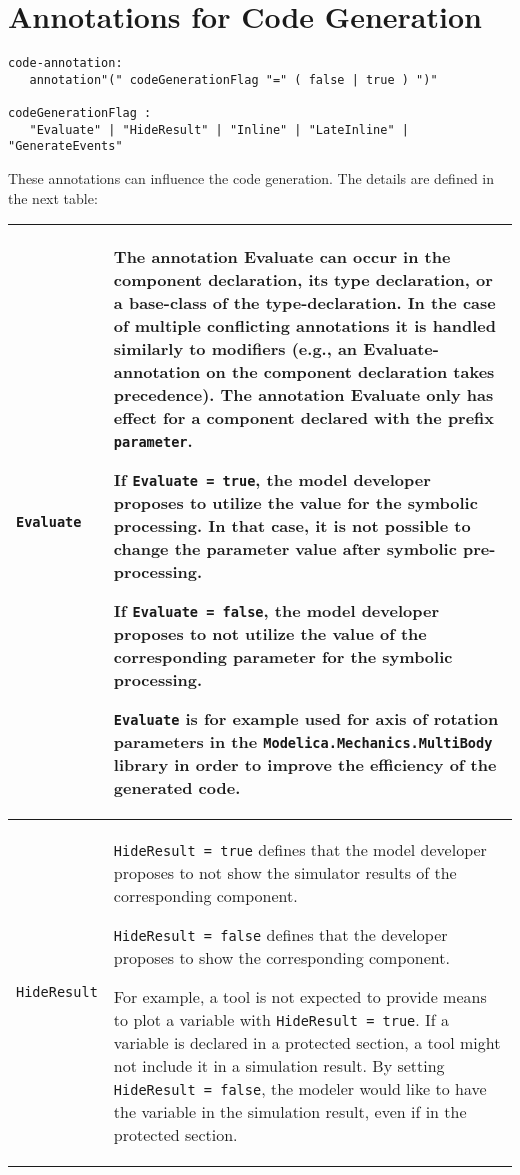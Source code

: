 \section{Annotations for Code Generation}\label{annotations-for-code-generation}
\begin{lstlisting}[language=grammar]
code-annotation:
   annotation"(" codeGenerationFlag "=" ( false | true ) ")"

codeGenerationFlag :
   "Evaluate" | "HideResult" | "Inline" | "LateInline" | "GenerateEvents"
\end{lstlisting}
These annotations can influence the code generation. The details are
defined in the next table:
\begin{longtable}[]{|p{4.2cm}|p{10cm}|}
\hline \endhead
\lstinline!Evaluate!&
The annotation Evaluate can occur in the component declaration, its type
declaration, or a base-class of the type-declaration. In the case of
multiple conflicting annotations it is handled similarly to modifiers
(e.g., an Evaluate-annotation on the component declaration takes
precedence). The annotation Evaluate only has effect for a component
declared with the prefix \lstinline!parameter!.

If \lstinline!Evaluate = true!, the model developer proposes to utilize the value
for the symbolic processing. In that case, it is not possible to change
the parameter value after symbolic pre-processing.

If \lstinline!Evaluate = false!, the model developer proposes to not utilize the
value of the corresponding parameter for the symbolic processing.

\begin{nonnormative}
\lstinline!Evaluate! is for example used for axis of rotation parameters in
the \lstinline!Modelica.Mechanics.MultiBody! library in order to improve the
efficiency of the generated code.
\end{nonnormative}
\\ \hline
\lstinline!HideResult! &
\lstinline!HideResult = true! defines that the model developer proposes to not show
the simulator results of the corresponding component.

\lstinline!HideResult = false! defines that the developer proposes to show the
corresponding component.

\begin{nonnormative}
For example, a tool is not expected to provide means to plot a variable with \lstinline!HideResult = true!.
If a variable is declared in a protected section, a tool might not include it in a simulation result.
By setting \lstinline!HideResult = false!, the modeler would like to have the variable in the simulation
result, even if in the protected section.


\end{nonnormative}
\end{longtable}
